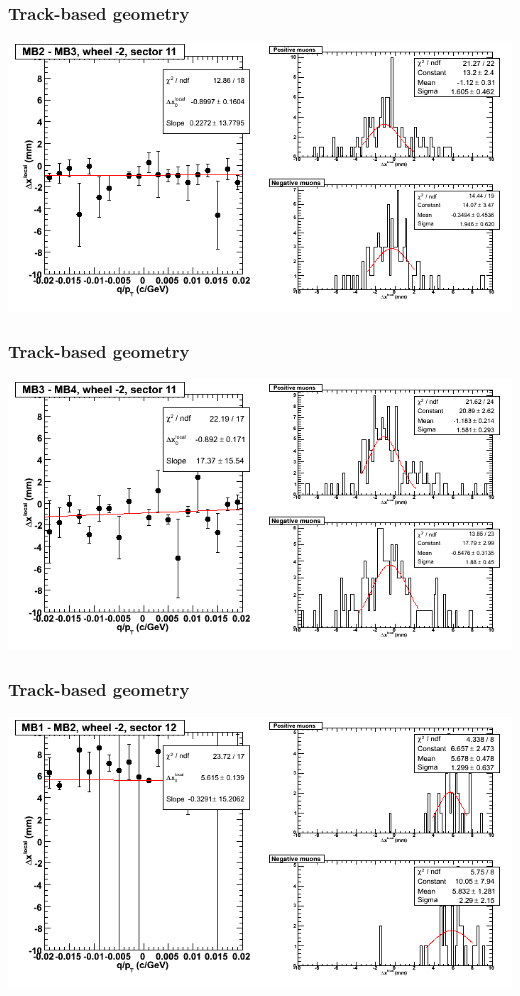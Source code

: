 \documentclass[compress]{beamer}
\begin{document}
\begin{frame}
\frametitle{Track-based geometry}
\includegraphics[width=\linewidth]{NOV4_segdiffs/dt13_resid_A_11_23.png}
\end{frame}

\begin{frame}
\frametitle{Track-based geometry}
\includegraphics[width=\linewidth]{NOV4_segdiffs/dt13_resid_A_11_34.png}
\end{frame}

\begin{frame}
\frametitle{Track-based geometry}
\includegraphics[width=\linewidth]{NOV4_segdiffs/dt13_resid_A_12_12.png}
\end{frame}
\end{document}
